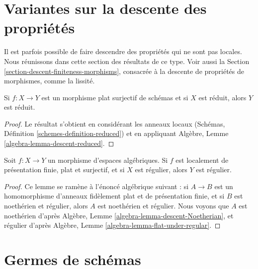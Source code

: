 \section{Variantes sur la descente des propriétés}
\label{section-variants}

\noindent
Il est parfois possible de faire descendre des propriétés qui ne sont pas
locales. Nous réunissons dans cette section des résultats de ce type. Voir
aussi la Section \ref{section-descent-finiteness-morphisms}, consacrée à la
descente de propriétés de morphismes, comme la lissité.

\begin{lemma}
\label{lemma-descend-reduced}
Si $f : X \to Y$ est un morphisme plat surjectif de schémas et si $X$ est
réduit, alors $Y$ est réduit.
\end{lemma}

\begin{proof}
Le résultat s'obtient en considérant les anneaux locaux (Schémas, Définition
\ref{schemes-definition-reduced}) et en appliquant Algèbre, Lemme
\ref{algebra-lemma-descent-reduced}.
\end{proof}

\begin{lemma}
\label{lemma-descend-regular}
Soit $f : X \to Y$ un morphisme d'espaces algébriques. Si $f$ est localement
de présentation finie, plat et surjectif, et si $X$ est régulier, alors $Y$
est régulier.
\end{lemma}

\begin{proof}
Ce lemme se ramène à l'énoncé algébrique suivant : si $A \to B$ est un
homomorphisme d'anneaux fidèlement plat et de présentation finie, et si $B$
est noethérien et régulier, alors $A$ est noethérien et régulier. Nous voyons
que $A$ est noethérien d'après Algèbre, Lemme
\ref{algebra-lemma-descent-Noetherian}, et régulier d'après Algèbre, Lemme
\ref{algebra-lemma-flat-under-regular}.
\end{proof}









\section{Germes de schémas}
\label{section-germs}

